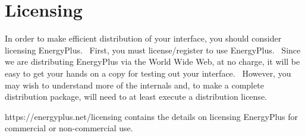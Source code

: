 \chapter{Licensing}\label{licensing}

In order to make efficient distribution of your interface, you should consider licensing EnergyPlus.~ First, you must license/register to use EnergyPlus.~ Since we are distributing EnergyPlus via the World Wide Web, at no charge, it will be easy to get your hands on a copy for testing out your interface.~ However, you may wish to understand more of the internals and, to make a complete distribution package, will need to at least execute a distribution license.

https://energyplus.net/licensing contains the details on licensing EnergyPlus for commercial or non-commercial use.
